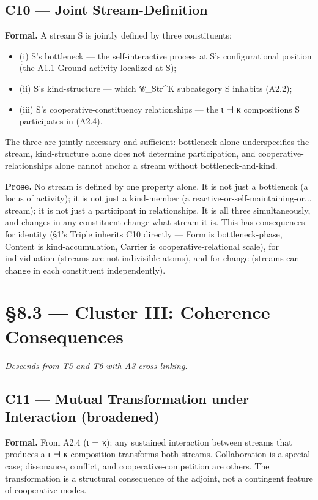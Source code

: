 \documentclass[11pt, openany]{book}
\newcommand{\sectionbreak}{\clearpage}
\begin{document}
\subsection{C10 --- Joint Stream-Definition}

\textbf{Formal.} A stream S is jointly defined by three constituents:

\begin{itemize}
\item (i) S's bottleneck --- the self-interactive process at S's configurational position (the A1.1 Ground-activity localized at S);
\item (ii) S's kind-structure --- which 𝒞\_\allowbreak{}Str\textasciicircum{}K subcategory S inhabits (A2.2);
\item (iii) S's cooperative-constituency relationships --- the ι ⊣ κ compositions S participates in (A2.4).
\end{itemize}

The three are jointly necessary and sufficient: bottleneck alone underspecifies the stream, kind-structure alone does not determine participation, and cooperative-relationships alone cannot anchor a stream without bottleneck-and-kind.

\textbf{Prose.} No stream is defined by one property alone. It is not just a bottleneck (a locus of activity); it is not just a kind-member (a reactive-or-self-maintaining-or... stream); it is not just a participant in relationships. It is all three simultaneously, and changes in any constituent change what stream it is. This has consequences for identity (§1's Triple inherits C10 directly --- Form is bottleneck-phase, Content is kind-accumulation, Carrier is cooperative-relational scale), for individuation (streams are not indivisible atoms), and for change (streams can change in each constituent independently).

\sectionbreak

\section{§8.3 --- Cluster III: Coherence Consequences}

\textit{Descends from T5 and T6 with A3 cross-linking.}

\subsection{C11 --- Mutual Transformation under Interaction (broadened)}

\textbf{Formal.} From A2.4 (ι ⊣ κ): any sustained interaction between streams that produces a ι ⊣ κ composition transforms both streams. Collaboration is a special case; dissonance, conflict, and cooperative-competition are others. The transformation is a structural consequence of the adjoint, not a contingent feature of cooperative modes.
\end{document}

